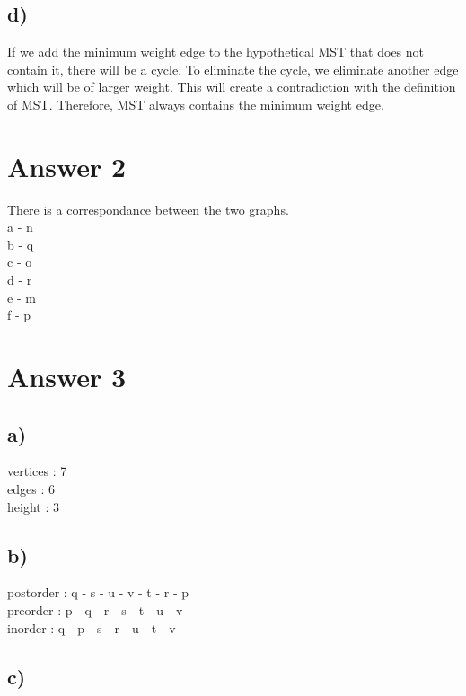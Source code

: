 \documentclass[11pt]{article}
\begin{document}
\subsection*{d)}
	
	If we add the minimum weight edge to the hypothetical MST that does not contain it, there will be a cycle. To eliminate the cycle, we eliminate another edge which
	will be of larger weight. This will create a contradiction with the definition of MST. Therefore, MST always contains the minimum weight edge.

\section*{Answer 2}

	There is a correspondance between the two graphs. \\
	a - n 	\\
	b - q \\
 	c - o 	\\
	d - r  \\
	e - m 	\\
	f - p \\


\section*{Answer 3}

\subsection*{a)}

	vertices : 7 \\
	edges : 6 \\
	height : 3 \\

\subsection*{b)}

	postorder : q - s - u - v - t - r - p \\
	preorder  : p - q - r - s - t - u - v \\
	inorder    : q - p - s - r - u - t - v \\

\subsection*{c)}
\end{document}
